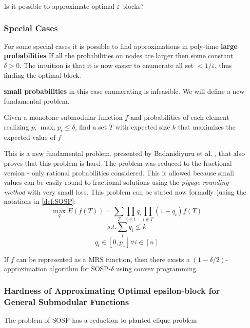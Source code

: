 Is it possible to approximate optimal $\varepsilon$ blocks?

\subsubsection{Special Cases}
For some special cases it is possible to find approximations in poly-time
\textbf{large probabilities}
If all the probabilities on nodes are larger then some constant $\delta >0$. The intuition is that it is now  easier to enumerate all set $<1/\varepsilon$, thus finding the optimal block.

\textbf{small probabilities} in this case enumerating is infeasible. We will define a new fundamental problem.

\begin{definition}\label{def:SOSP}
Given a monotone submodular function $f$ and probabilities of each element realizing $p$, $\max_i{p_i}\le \delta$, find a set $T$ with expected size $k$ that maximizes the expected value of $f$


\end{definition} 
This is a new fundamental problem, presented by Badanidiyuru et al. \cite{badanidiyuru2016locally}, that also proves that this problem is hard.
The problem was reduced to the fractional version - only rational probabilities considered. This is allowed because small values can be easily round to fractional solutions using the \textit{pigage rounding method} with very small loss. \cite{ageev2004pipage}
This problem can be stated now formally (using the notations in \ref{def:SOSP}:
$$\max_q{E(f(T))=\sum_T{\prod_{i\in t}{q_i}}\prod_{i\notin T}{(1-q_i)}}f(T)$$
$$s.t. \sum_i{q_i\le k}$$
$$q_i\in[0,p_1] \forall i\in[n]$$

\begin{theorem}
If $f$ can be represented as a MRS function, then there exists a $(1-\delta/2)$-approximation algorithm for SOSP-$\delta$ using convex programming 
\end{theorem}

\subsubsection{Hardness of Approximating Optimal epsilon-block for General Submodular Functions}
The problem of SOSP has a reduction to planted clique problem
